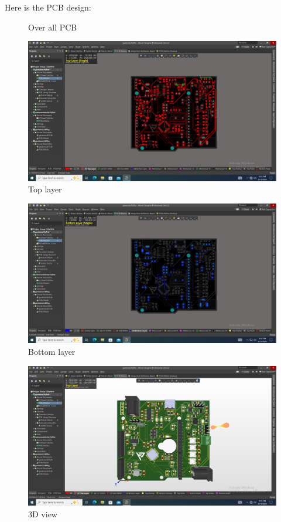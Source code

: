 \documentclass[a4paper,11pt]{article}%
\begin{document}
Here is the PCB design:\\
\begin{figure}[H]
	\centering
	\caption{Over all PCB}
	\label{top}
\end{figure}

\begin{figure}[H]
	\centering
	\includegraphics[scale=0.6]{figures/pcb/top_layer.png}
	\caption{Top layer}
	\label{top}
\end{figure}

\begin{figure}[H]
	\centering
	\includegraphics[scale=0.6]{figures/pcb/bottom_layer.png}
	\caption{Bottom layer}
	\label{top}
\end{figure}

\begin{figure}[H]
	\centering
	\includegraphics[scale=0.6]{figures/pcb/3d.png}
	\caption{3D view}
	\label{top}
\end{figure}
\end{document}

